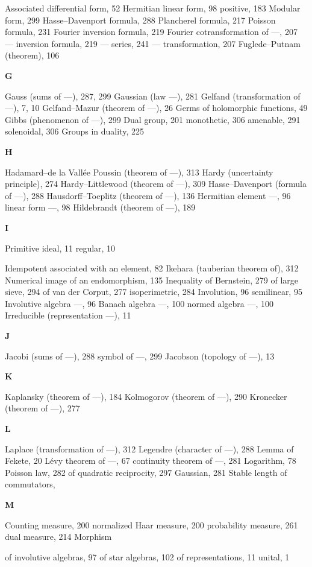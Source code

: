 Associated differential form, 52 Hermitian linear form, 98 positive, 183 Modular form, 299 Hasse--Davenport formula, 288 Plancherel formula, 217 Poisson formula, 231 Fourier inversion formula, 219 Fourier cotransformation of ---, 207 --- inversion formula, 219 --- series, 241 --- transformation, 207 Fuglede--Putnam (theorem), 106

\textbf{G}

Gauss (sums of ---), 287, 299 Gaussian (law ---), 281 Gelfand (transformation of ---), 7, 10 Gelfand--Mazur (theorem of ---), 26 Germs of holomorphic functions, 49 Gibbs (phenomenon of ---), 299 Dual group, 201 monothetic, 306 amenable, 291 solenoidal, 306 Groups in duality, 225

\textbf{H}

Hadamard--de la Vallée Poussin (theorem of ---), 313 Hardy (uncertainty principle), 274 Hardy--Littlewood (theorem of ---), 309 Hasse--Davenport (formula of ---), 288 Hausdorff--Toeplitz (theorem of ---), 136 Hermitian element ---, 96 linear form ---, 98 Hildebrandt (theorem of ---), 189

\textbf{I}

Primitive ideal, 11 regular, 10

Idempotent associated with an element, 82 Ikehara (tauberian theorem of), 312 Numerical image of an endomorphism, 135 Inequality of Bernstein, 279 of large sieve, 294 of van der Corput, 277 isoperimetric, 284 Involution, 96 semilinear, 95 Involutive algebra ---, 96 Banach algebra ---, 100 normed algebra ---, 100 Irreducible (representation ---), 11

\textbf{J}

Jacobi (sums of ---), 288 symbol of ---, 299 Jacobson (topology of ---), 13

\textbf{K}

Kaplansky (theorem of ---), 184 Kolmogorov (theorem of ---), 290 Kronecker (theorem of ---), 277

\textbf{L}

Laplace (transformation of ---), 312 Legendre (character of ---), 288 Lemma of Fekete, 20 Lévy theorem of ---, 67 continuity theorem of ---, 281 Logarithm, 78 Poisson law, 282 of quadratic reciprocity, 297 Gaussian, 281 Stable length of commutators,

\textbf{M}

Counting measure, 200 normalized Haar measure, 200 probability measure, 261 dual measure, 214 Morphism

of involutive algebras, 97 of star algebras, 102 of representations, 11 unital, 1

